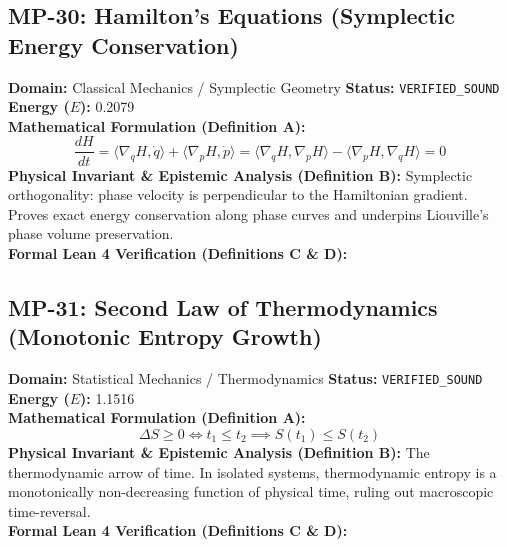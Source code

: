\subsection{MP-30: Hamilton's Equations (Symplectic Energy Conservation)}
\textbf{Domain:} Classical Mechanics / Symplectic Geometry \hfill \textbf{Status:} \texttt{VERIFIED\_SOUND} \hfill \textbf{Energy ($E$):} 0.2079\\
\textbf{Mathematical Formulation (Definition A):}
\begin{equation*}
\frac{dH}{dt} = \langle \nabla_q H, \dot{q} \rangle + \langle \nabla_p H, \dot{p} \rangle = \langle \nabla_q H, \nabla_p H \rangle - \langle \nabla_p H, \nabla_q H \rangle = 0
\end{equation*}
\textbf{Physical Invariant \& Epistemic Analysis (Definition B):}
Symplectic orthogonality: phase velocity is perpendicular to the Hamiltonian gradient. Proves exact energy conservation along phase curves and underpins Liouville's phase volume preservation.\\

\textbf{Formal Lean 4 Verification (Definitions C \& D):}


\vspace{1em}
\subsection{MP-31: Second Law of Thermodynamics (Monotonic Entropy Growth)}
\textbf{Domain:} Statistical Mechanics / Thermodynamics \hfill \textbf{Status:} \texttt{VERIFIED\_SOUND} \hfill \textbf{Energy ($E$):} 1.1516\\
\textbf{Mathematical Formulation (Definition A):}
\begin{equation*}
\Delta S \ge 0 \iff t_1 \le t_2 \implies S(t_1) \le S(t_2)
\end{equation*}
\textbf{Physical Invariant \& Epistemic Analysis (Definition B):}
The thermodynamic arrow of time. In isolated systems, thermodynamic entropy is a monotonically non-decreasing function of physical time, ruling out macroscopic time-reversal.\\

\textbf{Formal Lean 4 Verification (Definitions C \& D):}


\vspace{1em}

